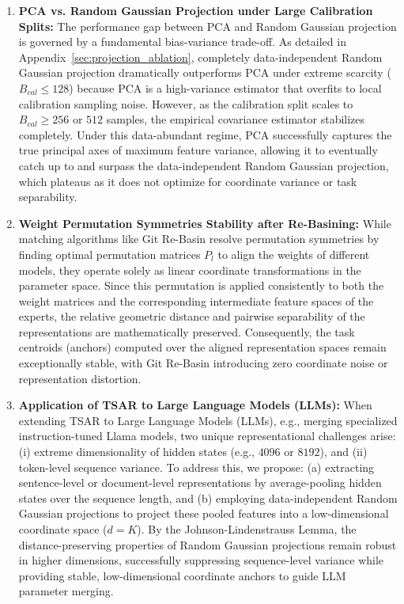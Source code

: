 \begin{enumerate}
    \item \textbf{PCA vs. Random Gaussian Projection under Large Calibration Splits:}
    The performance gap between PCA and Random Gaussian projection is governed by a fundamental
bias-variance trade-off. As detailed in Appendix~\ref{sec:projection_ablation}, completely
data-independent Random Gaussian projection dramatically outperforms PCA under extreme scarcity
($B_{cal} \le 128$) because PCA is a high-variance estimator that overfits to local calibration
sampling noise. However, as the calibration split scales to $B_{cal} \ge 256$ or $512$ samples, the
empirical covariance estimator stabilizes completely. Under this data-abundant regime, PCA
successfully captures the true principal axes of maximum feature variance, allowing it to eventually
catch up to and surpass the data-independent Random Gaussian projection, which plateaus as it does
not optimize for coordinate variance or task separability.

    \item \textbf{Weight Permutation Symmetries Stability after Re-Basining:}
    While matching algorithms like Git Re-Basin resolve permutation symmetries by finding optimal permutation matrices $P_l$ to align the weights of different models, they operate solely as linear coordinate transformations in the parameter space. Since this permutation is applied consistently to both the weight matrices and the corresponding intermediate feature spaces of the experts, the relative geometric distance and pairwise separability of the representations are mathematically preserved. Consequently, the task centroids (anchors) computed over the aligned representation spaces remain exceptionally stable, with Git Re-Basin introducing zero coordinate noise or representation distortion.
    
    \item \textbf{Application of TSAR to Large Language Models (LLMs):}
    When extending TSAR to Large Language Models (LLMs), e.g., merging specialized instruction-tuned Llama models, two unique representational challenges arise: (i) extreme dimensionality of hidden states (e.g., $4096$ or $8192$), and (ii) token-level sequence variance. To address this, we propose: (a) extracting sentence-level or document-level representations by average-pooling hidden states over the sequence length, and (b) employing data-independent Random Gaussian projections to project these pooled features into a low-dimensional coordinate space ($d = K$). By the Johnson-Lindenstrauss Lemma, the distance-preserving properties of Random Gaussian projections remain robust in higher dimensions, successfully suppressing sequence-level variance while providing stable, low-dimensional coordinate anchors to guide LLM parameter merging.


\end{enumerate}

